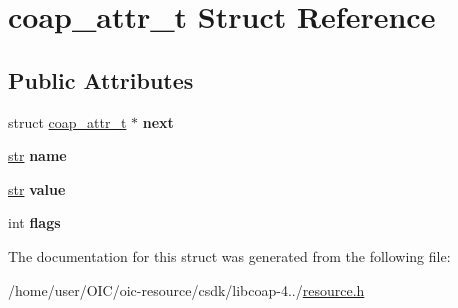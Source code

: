 \hypertarget{structcoap__attr__t}{}\section{coap\+\_\+attr\+\_\+t Struct Reference}
\label{structcoap__attr__t}
\subsection*{Public Attributes}
\begin{DoxyCompactItemize}
\item 
\hypertarget{structcoap__attr__t_a3fc77f201bd40341e3b9a9b66917ee9f}{}struct \hyperlink{structcoap__attr__t}{coap\+\_\+attr\+\_\+t} $\ast$ {\bfseries next}\label{structcoap__attr__t_a3fc77f201bd40341e3b9a9b66917ee9f}

\item 
\hypertarget{structcoap__attr__t_affa13bea58f6e0eaa09377872347cfbb}{}\hyperlink{structstr}{str} {\bfseries name}\label{structcoap__attr__t_affa13bea58f6e0eaa09377872347cfbb}

\item 
\hypertarget{structcoap__attr__t_a16e2ca35817107377d85b6dfaf3111f0}{}\hyperlink{structstr}{str} {\bfseries value}\label{structcoap__attr__t_a16e2ca35817107377d85b6dfaf3111f0}

\item 
\hypertarget{structcoap__attr__t_ae169f2ea32a124079529bfe934d7e0ec}{}int {\bfseries flags}\label{structcoap__attr__t_ae169f2ea32a124079529bfe934d7e0ec}

\end{DoxyCompactItemize}


The documentation for this struct was generated from the following file\+:\begin{DoxyCompactItemize}
\item 
/home/user/\+O\+I\+C/oic-\/resource/csdk/libcoap-\/4../\hyperlink{resource_8h}{resource.\+h}\end{DoxyCompactItemize}
